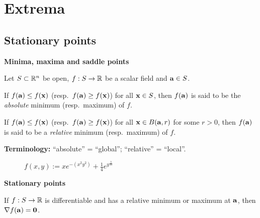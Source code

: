 \section{Extrema}

\subsection{Stationary points}


\textbf{Minima, maxima and saddle points}





Let \(S\subset \bR^n\) be open,
\(f:S \to \bR\) be a scalar field
and \(\aa \in S\).

\begin{definition}
    If \(f(\aa)\leq f(\xx)\) (resp.\ \(f(\aa)\geq f(\xx)\)) for all \(\xx \in S\), then \(f(\aa)\) is said to be the \emph{absolute} minimum (resp.\ maximum) of \(f\).
\end{definition}

\begin{definition}
    If \(f(\aa)\leq f(\xx)\) (resp.\ \(f(\aa)\geq f(\xx)\)) for all \(\xx \in B(\aa,r)\) for some \(r>0\), then \(f(\aa)\) is said to be a \emph{relative} minimum (resp.\ maximum) of \(f\).
\end{definition}


\textbf{Terminology:}
``absolute'' = ``global'';
``relative'' = ``local''.
\begin{figure}
    \centering
    \caption{$f(x,y) := x e^{-(x^2y^2)}  + \frac{1}{4}e^{y^\frac{3}{10}}$}
\end{figure}








\textbf{Stationary points}




\begin{theorem}
    If \(f:S\to\bR\) is differentiable and has a relative minimum or maximum at \(\aa\), then \(\nabla f(\aa)=  \mathbf{0}\).
\end{theorem}


